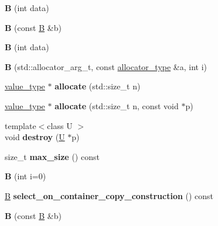 \begin{DoxyCompactItemize}
{\bfseries B} (int data)
\item 
\mbox{\label{struct_b_a87ff0c192f7370599939c7cd601d5b4d}} 
{\bfseries B} (const \mbox{\hyperlink{struct_b}{B}} \&b)
\item 
\mbox{\label{struct_b_a9c38e0aaea220d657a5985086fe3759c}} 
{\bfseries B} (int data)
\item 
\mbox{\label{struct_b_af43edf0705c994c2f9b3786bbf4ecb7a}} 
{\bfseries B} (std\+::allocator\+\_\+arg\+\_\+t, const \mbox{\hyperlink{struct_a1}{allocator\+\_\+type}} \&a, int i)
\item 
\mbox{\label{struct_b_a4abb890b30e5427e8837b07dc15190ff}} 
\mbox{\hyperlink{struct_t}{value\+\_\+type}} $\ast$ {\bfseries allocate} (std\+::size\+\_\+t n)
\item 
\mbox{\label{struct_b_a6b2c62f8c074ddd8038371d126c0d6c0}} 
\mbox{\hyperlink{struct_t}{value\+\_\+type}} $\ast$ {\bfseries allocate} (std\+::size\+\_\+t n, const void $\ast$p)
\item 
\mbox{\label{struct_b_ac8a209edad028ce95e995e7b09c0dcec}} 
{\footnotesize template$<$class U $>$ }\\void {\bfseries destroy} (\mbox{\hyperlink{union_u}{U}} $\ast$p)
\item 
\mbox{\label{struct_b_a178a0d3e1bf004b0bd2e3b8a650f223d}} 
size\+\_\+t {\bfseries max\+\_\+size} () const
\item 
\mbox{\label{struct_b_aaad4c6e84b48e8927c5be62550d2b45d}} 
{\bfseries B} (int i=0)
\item 
\mbox{\label{struct_b_af25c423a9ca4c1a6be9e210fb6e7bd3d}} 
\mbox{\hyperlink{struct_b}{B}} {\bfseries select\+\_\+on\+\_\+container\+\_\+copy\+\_\+construction} () const
\item 
\mbox{\label{struct_b_a87ff0c192f7370599939c7cd601d5b4d}} 
{\bfseries B} (const \mbox{\hyperlink{struct_b}{B}} \&b)
\item 
\mbox{\label{struct_b_a87ff0c192f7370599939c7cd601d5b4d}} 

\end{DoxyCompactItemize}
